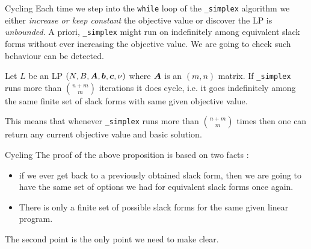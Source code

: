 \documentclass[aspectratio = 169]{beamer}
\begin{document}
\begin{frame}{Cycling}
  Each time we step into the \texttt{while} loop of the
  \texttt{_simplex} algorithm we either \textit{increase or keep
    constant} the objective value or discover the LP is
  \textit{unbounded}. A priori, \texttt{_simplex} might run
  on indefinitely among equivalent slack forms without ever increasing
  the objective value. We are going to check such behaviour can be
  detected.
  \pause
    \begin{prop}[\textbf{C}]
      Let $L$ be an LP $(N, B, \boldsymbol{A}, \boldsymbol{b}, \boldsymbol{c}, \nu)$ where
      $\boldsymbol{A}$ is an $(m, n)$ matrix. If \texttt{_simplex}
      runs more than $\binom{n+m}{m}$ iterations it does cycle,
      i.e. it goes indefinitely among the same finite set of slack
      forms with same given objective value.
    \end{prop}
    \begin{rem}
      This means that whenever \texttt{_simplex} runs more
      than $\binom{n+m}{m}$ times then one can return any current
      objective value and basic solution.
    \end{rem}
    \end{frame}

    \begin{frame}{Cycling}
        The proof of the above proposition is based on two facts :
        \begin{itemize}
        \item if we ever get back to a previously obtained slack form,
          then we are going to have the same set of options we had for
          equivalent slack forms once again.
        \item There is only a finite set of possible slack forms for
          the same given linear program.
        \end{itemize}
        \pause
        The second point is the only point we need to make clear.
    \end{frame}
\end{document}
